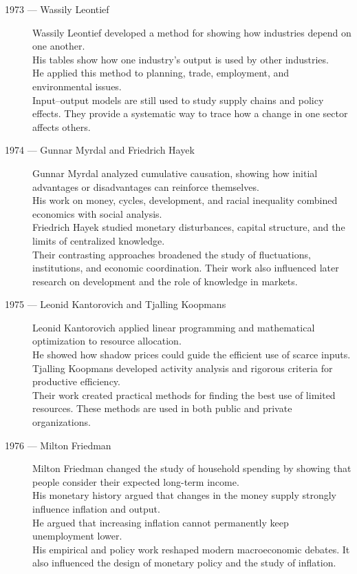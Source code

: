 \documentclass[12pt]{report}
\begin{document}
{\begin{description}
\item[1973 --- Wassily Leontief]
Wassily Leontief developed a method for showing how industries depend on one another.\\
His tables show how one industry's output is used by other industries.\\
He applied this method to planning, trade, employment, and environmental issues.\\
Input--output models are still used to study supply chains and policy effects. They provide a systematic way to trace how a change in one sector affects others.

\item[1974 --- Gunnar Myrdal and Friedrich Hayek]
Gunnar Myrdal analyzed cumulative causation, showing how initial advantages or disadvantages can reinforce themselves.\\
His work on money, cycles, development, and racial inequality combined economics with social analysis.\\
Friedrich Hayek studied monetary disturbances, capital structure, and the limits of centralized knowledge.\\
Their contrasting approaches broadened the study of fluctuations, institutions, and economic coordination. Their work also influenced later research on development and the role of knowledge in markets.

\item[1975 --- Leonid Kantorovich and Tjalling Koopmans]
Leonid Kantorovich applied linear programming and mathematical optimization to resource allocation.\\
He showed how shadow prices could guide the efficient use of scarce inputs.\\
Tjalling Koopmans developed activity analysis and rigorous criteria for productive efficiency.\\
Their work created practical methods for finding the best use of limited resources. These methods are used in both public and private organizations.

\item[1976 --- Milton Friedman]
Milton Friedman changed the study of household spending by showing that people consider their expected long-term income.\\
His monetary history argued that changes in the money supply strongly influence inflation and output.\\
He argued that increasing inflation cannot permanently keep unemployment lower.\\
His empirical and policy work reshaped modern macroeconomic debates. It also influenced the design of monetary policy and the study of inflation.


\end{description}}
\end{document}
